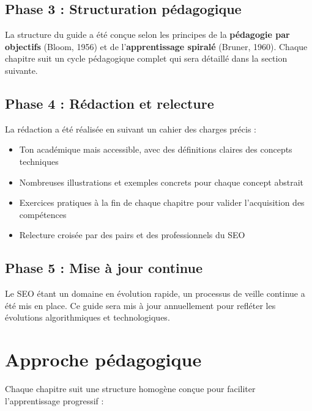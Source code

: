 \documentclass[12pt,a4paper,twoside]{report}
\newcommand{\keyword}[1]{\textbf{\textcolor{googleblue}{#1}}}
\begin{document}
\subsection*{Phase 3 : Structuration pédagogique}

La structure du guide a été conçue selon les principes de la \keyword{pédagogie par objectifs} (Bloom, 1956) et de l'\keyword{apprentissage spiralé} (Bruner, 1960). Chaque chapitre suit un cycle pédagogique complet qui sera détaillé dans la section suivante.

\subsection*{Phase 4 : Rédaction et relecture}

La rédaction a été réalisée en suivant un cahier des charges précis :
\begin{itemize}
    \item Ton académique mais accessible, avec des définitions claires des concepts techniques
    \item Nombreuses illustrations et exemples concrets pour chaque concept abstrait
    \item Exercices pratiques à la fin de chaque chapitre pour valider l'acquisition des compétences
    \item Relecture croisée par des pairs et des professionnels du SEO
\end{itemize}

\subsection*{Phase 5 : Mise à jour continue}

Le SEO étant un domaine en évolution rapide, un processus de veille continue a été mis en place. Ce guide sera mis à jour annuellement pour refléter les évolutions algorithmiques et technologiques.

\section*{Approche pédagogique}

Chaque chapitre suit une structure homogène conçue pour faciliter l'apprentissage progressif :
\end{document}
